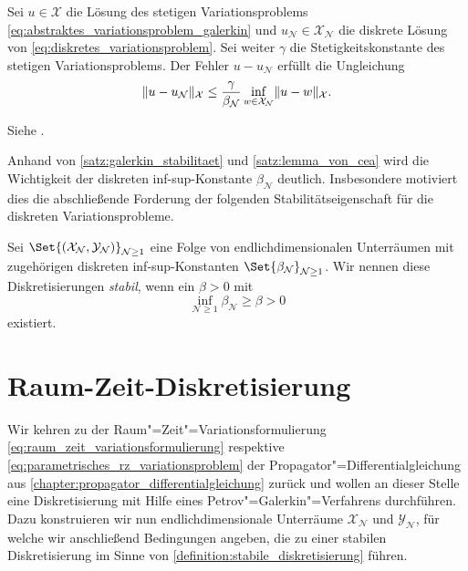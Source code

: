 \documentclass[../main.tex]{subfiles}
\begin{document}
\begin{Satz}
    \label{satz:lemma_von_cea}
    Sei $u \in \mathcal X$ die Lösung des stetigen Variationsproblems \cref{eq:abstraktes_variationsproblem_galerkin} und $u_{\mathcal N} \in \mathcal X_{\mathcal N}$ die diskrete Lösung von \cref{eq:diskretes_variationsproblem}.
    Sei weiter $\gamma$ die Stetigkeitskonstante des stetigen Variationsproblems.
    Der Fehler $u - u_{\mathcal N}$ erfüllt die Ungleichung
    \begin{equation}
        \label{eq:lemma_von_cea}
        \lVert u - u_{\mathcal N}\rVert_{\mathcal X} \leq \frac{\gamma}{\beta_{\mathcal N}} \inf_{w \in \mathcal X_{\mathcal N}} \lVert u - w\rVert_{\mathcal X}.
    \end{equation}

    \begin{Beweis}
        Siehe \cite[Theorem 3.2]{Nochetto:2009il}.
    \end{Beweis}
\end{Satz}

Anhand von \cref{satz:galerkin_stabilitaet} und \cref{satz:lemma_von_cea} wird die Wichtigkeit der diskreten inf-sup-Konstante $\beta_{\mathcal N}$ deutlich.
Insbesondere motiviert dies die abschließende Forderung der folgenden Stabilitätseigenschaft für die diskreten Variationsprobleme.

\begin{Definition}
\label{definition:stabile_diskretisierung}
    Sei $\Set{(\mathcal X_{\mathcal N}, \mathcal Y_{\mathcal N})}_{\mathcal N \geq 1}$ eine Folge von endlichdimensionalen Unterräumen mit zugehörigen diskreten inf-sup-Konstanten $\Set{\beta_{\mathcal N}}_{\mathcal N \geq 1}$.
    Wir nennen diese Diskretisierungen \emph{stabil}, wenn ein $\beta > 0$ mit
    \begin{equation}
        \inf_{\mathcal N \geq 1} \beta_{\mathcal N} \geq \beta > 0
    \end{equation}
    existiert.
\end{Definition}


\section{Raum-Zeit-Diskretisierung} %
\label{section:raum_zeit_diskretisierung}

Wir kehren zu der Raum"=Zeit"=Variationsformulierung \cref{eq:raum_zeit_variationsformulierung} respektive \cref{eq:parametrisches_rz_variationsproblem} der Propagator"=Differentialgleichung aus \cref{chapter:propagator_differentialgleichung} zurück und wollen an dieser Stelle eine Diskretisierung mit Hilfe eines Petrov"=Galerkin"=Verfahrens durchführen.
Dazu konstruieren wir nun endlichdimensionale Unterräume $\mathcal X_{\mathcal N}$ und $\mathcal Y_{\mathcal N}$, für welche wir anschließend Bedingungen angeben, die zu einer stabilen Diskretisierung im Sinne von \cref{definition:stabile_diskretisierung} führen.
\end{document}
